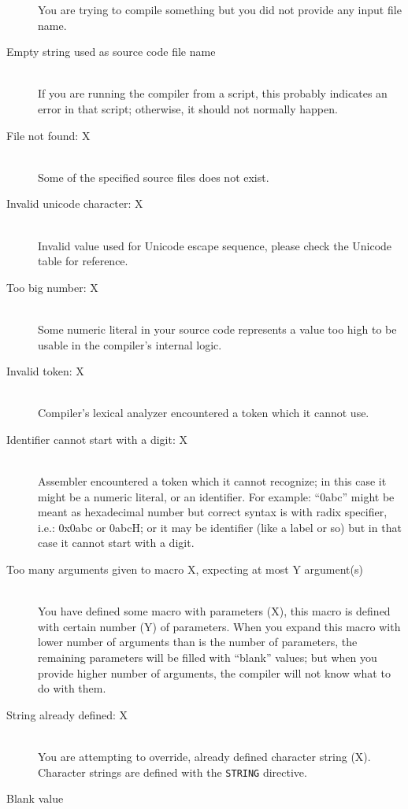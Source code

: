 \begin{description}
            You are trying to compile something but you did not provide any input file name.
        \item[Empty string used as source code file name]~\\
            If you are running the compiler from a script, this probably indicates an error in that script; otherwise, it should not normally happen.
        \item[File not found: X]~\\
            Some of the specified source files does not exist.
        \item[Invalid unicode character: X]~\\
            Invalid value used for Unicode escape sequence, please check the Unicode table for reference.
        \item[Too big number: X]~\\
            Some numeric literal in your source code represents a value too high to be usable in the compiler's internal logic.
        \item[Invalid token: X]~\\
            Compiler's lexical analyzer encountered a token which it cannot use.
        \item[Identifier cannot start with a digit: X]~\\
            Assembler encountered a token which it cannot recognize; in this case it might be a numeric literal, or an identifier. For example: ``0abc'' might be meant as hexadecimal number but correct syntax is with radix specifier, i.e.: 0x0abc or 0abcH; or it may be identifier (like a label or so) but in that case it cannot start with a digit.
        \item[Too many arguments given to macro X, expecting at most Y argument(s)]~\\
            You have defined some macro with parameters (X), this macro is defined with certain number (Y) of parameters. When you expand this macro with lower number of arguments than is the number of parameters, the remaining parameters will be filled with ``blank'' values; but when you provide higher number of arguments, the compiler will not know what to do with them.
        \item[String already defined: X]~\\
            You are attempting to override, already defined character string (X). Character strings are defined with the \texttt{STRING} directive.
        \item[Blank value]~\\

\end{description}
